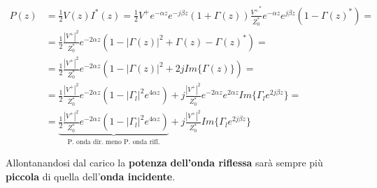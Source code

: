 \begin{equation*}
    \begin{aligned}
    P(z) &= \frac{1}{2} V(z) I^*(z) = \frac{1}{2} V^+ e^{-\alpha z} e^{-j \beta z} \left(1 + \Gamma(z) \right) \frac{{V^+}^*}{Z_0^*}e^{-\alpha z} e^{j \beta z} \left(1 - {\Gamma(z)}^* \right) =\\
    &= \frac{1}{2} \frac{|V^+|^2}{Z_0^*} e^{-2\alpha z}\left(1 - |\Gamma(z)|^2 + \Gamma(z) - {\Gamma(z)}^* \right) =\\
    &= \frac{1}{2} \frac{|V^+|^2}{Z_0^*} e^{-2\alpha z}\left(1 - |\Gamma(z)|^2 +2j Im\{\Gamma(z)\} \right) =\\
    &= \frac{1}{2} \frac{|V^+|^2}{Z_0^*} e^{-2\alpha z}\left(1 - |\Gamma_l|^2 e^{4\alpha z}\right) + j  \frac{|V^+|^2}{Z_0^*} e^{-2\alpha z}e^{2\alpha z} Im\{\Gamma_l e^{2j\beta z}\}=\\
    &= \underbrace{\frac{1}{2} \frac{|V^+|^2}{Z_0^*} e^{-2\alpha z}\left(1 - {|\Gamma_l|}^2 e^{4\alpha z}\right)}_{\text{P. onda dir.\ meno P. onda rifl.}} + j  \frac{{|V^+|}^2}{Z_0^*}Im\{\Gamma_l e^{2j\beta z}\}
    \end{aligned}
\end{equation*}

Allontanandosi dal carico la \textbf{potenza} \textbf{dell'onda riflessa} sarà sempre più \textbf{piccola} di quella dell'\textbf{onda incidente}.






